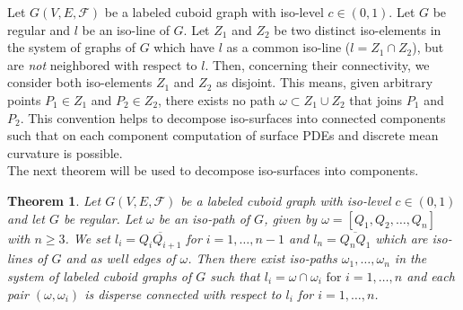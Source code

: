 \documentclass[a4paper,11pt]{article}
\newtheorem{theorem}{Theorem}[section]
\begin{document}
Let $G(V,E,\mathcal{F})$ be  a labeled cuboid graph
with iso-level $c\in (0,1)$. Let $G$ be regular and $l$ be an iso-line of $G$. Let $Z_1$ and $Z_2$ be two
distinct iso-elements in the system of graphs of $G$ which have $l$ as a common iso-line ($l=Z_1\cap Z_2$),
but are {\it not} neighbored with respect to $l$. Then, concerning their connectivity, we consider both
iso-elements $Z_1$ and $Z_2$ as disjoint. This means, given arbitrary points $P_1\in Z_1$ and $P_2\in Z_2$,
there exists no path $\omega\subset Z_1\cup Z_2$ that joins $P_1$ and $P_2$. This convention helps to
decompose iso-surfaces into connected components such that on each component computation of surface PDEs
and discrete mean curvature is possible.\\

\noindent The next theorem will be used to decompose iso-surfaces into components.
\begin{theorem}Let $G(V,E,\mathcal{F})$ be a labeled cuboid graph with iso-level $c\in (0,1)$ and let
$G$ be regular. Let $\omega$ be an iso-path of $G$, given by $\omega=[Q_1,Q_2,\ldots,Q_n]$ with
$n\geq 3$. We set $l_i=\overline{Q_iQ_{i+1}}$ for $i=1,\ldots,n-1$ and $l_n=\overline{Q_nQ_1}$ which
are iso-lines of $G$ and as well edges of $\omega$. Then there exist iso-paths $\omega_1,\ldots,\omega_n$ in
the system of labeled cuboid graphs of $G$ such that $l_i=\omega\cap \omega_i \mbox{ for }i=1,\ldots,n$ and
each pair $(\omega,\omega_i)$ is disperse connected with respect to $l_i$ for $i=1,\ldots,n$.
\label{thm:iso-path-connectedness-disperse-paths}
\end{theorem}
\end{document}
